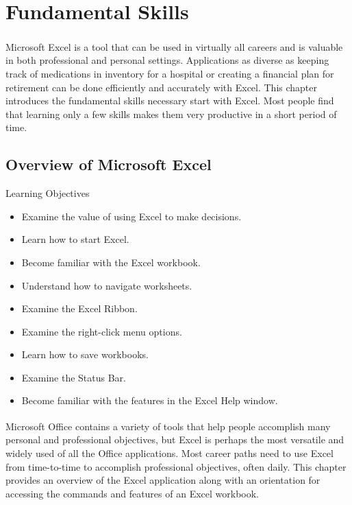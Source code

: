 \chapter{Fundamental Skills}\label{ch01:fundamentals}

Microsoft\textsuperscript{\textregistered} Excel\textsuperscript{\textregistered} is a tool that can be used in virtually all careers and is valuable in both professional and personal settings. Applications as diverse as keeping track of medications in inventory for a hospital or creating a financial plan for retirement can be done efficiently and accurately with Excel. This chapter introduces the fundamental skills necessary start with Excel. Most people find that learning only a few skills makes them very productive in a short period of time. 

\section{Overview of Microsoft Excel}

\begin{center}
	\begin{objbox}{Learning Objectives}
		\begin{itemize}
			\setlength{\itemsep}{0pt}
			\setlength{\parskip}{0pt}
			\setlength{\parsep}{0pt}
			
			\item Examine the value of using Excel to make decisions.
			\item Learn how to start Excel.
			\item Become familiar with the Excel workbook.
			\item Understand how to navigate worksheets.
			\item Examine the Excel Ribbon.
			\item Examine the right-click menu options.
			\item Learn how to save workbooks.
			\item Examine the Status Bar.
			\item Become familiar with the features in the Excel Help window.
			
		\end{itemize}
	\end{objbox}
\end{center}

Microsoft\textsuperscript{\textregistered} Office\textsuperscript{\textregistered} contains a variety of tools that help people accomplish many personal and professional objectives, but Excel is perhaps the most versatile and widely used of all the Office applications. Most career paths need to use Excel from time-to-time to accomplish professional objectives, often daily. This chapter provides an overview of the Excel application along with an orientation for accessing the commands and features of an Excel workbook.


